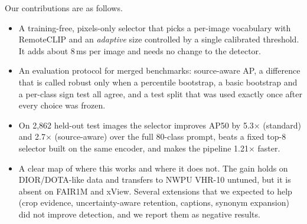 Our contributions are as follows.
\begin{itemize}
    \item A training-free, pixels-only selector that picks a per-image vocabulary with RemoteCLIP and an \emph{adaptive} size controlled by a single calibrated threshold. It adds about 8\,ms per image and needs no change to the detector.
    \item An evaluation protocol for merged benchmarks: source-aware AP, a difference that is called robust only when a percentile bootstrap, a basic bootstrap and a per-class sign test all agree, and a test split that was used exactly once after every choice was frozen.
    \item On 2,862 held-out test images the selector improves AP50 by 5.3$\times$ (standard) and 2.7$\times$ (source-aware) over the full 80-class prompt, beats a fixed top-8 selector built on the same encoder, and makes the pipeline 1.21$\times$ faster.
    \item A clear map of where this works and where it does not. The gain holds on DIOR/DOTA-like data and transfers to NWPU VHR-10 \cite{cheng2014nwpu} untuned, but it is absent on FAIR1M and xView. Several extensions that we expected to help (crop evidence, uncertainty-aware retention, captions, synonym expansion) did not improve detection, and we report them as negative results.
\end{itemize}

